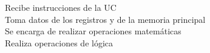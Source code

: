 \documentclass[preview]{standalone}
\begin{document}
Recibe instrucciones de la UC\\Toma datos de los registros y de la memoria principal\\Se encarga de realizar operaciones matemáticas\\Realiza operaciones de lógica\\
\end{document}
